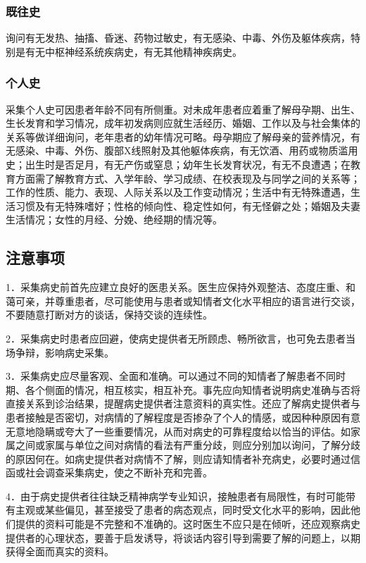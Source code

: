 \subsubsection{既往史}

询问有无发热、抽搐、昏迷、药物过敏史，有无感染、中毒、外伤及躯体疾病，特别是有无中枢神经系统疾病史，有无其他精神疾病史。

\subsubsection{个人史}

采集个人史可因患者年龄不同有所侧重。对未成年患者应着重了解母孕期、出生、生长发育和学习情况，成年初发病则应就生活经历、婚姻、工作以及与社会集体的关系等做详细询问，老年患者的幼年情况可略。母孕期应了解母亲的营养情况，有无感染、中毒、外伤、腹部X线照射及其他躯体疾病，有无饮酒、用药或物质滥用史；出生时是否足月，有无产伤或窒息；幼年生长发育状况，有无不良遭遇；在教育方面需了解教育方式、入学年龄、学习成绩、在校表现及与同学之间的关系等；工作的性质、能力、表现、人际关系以及工作变动情况；生活中有无特殊遭遇，生活习惯及有无特殊嗜好；性格的倾向性、稳定性如何，有无怪僻之处；婚姻及夫妻生活情况；女性的月经、分娩、绝经期的情况等。

\subsection{注意事项}

1．采集病史前首先应建立良好的医患关系。医生应保持外观整洁、态度庄重、和蔼可亲，并尊重患者，尽可能使用与患者或知情者文化水平相应的语言进行交谈，不要随意打断对方的谈话，保持交谈的连续性。

2．采集病史时患者应回避，使病史提供者无所顾虑、畅所欲言，也可免去患者当场争辩，影响病史采集。

3．采集病史应尽量客观、全面和准确。可以通过不同的知情者了解患者不同时期、各个侧面的情况，相互核实，相互补充。事先应向知情者说明病史准确与否将直接关系到诊治结果，提醒病史提供者注意资料的真实性。还应了解病史提供者与患者接触是否密切，对病情的了解程度是否掺杂了个人的情感，或因种种原因有意无意地隐瞒或夸大了一些重要情况，从而对病史的可靠程度给以恰当的评估。如家属之间或家属与单位之间对病情的看法有严重分歧，则应分别加以询问，了解分歧的原因何在。如病史提供者对病情不了解，则应请知情者补充病史，必要时通过信函或社会调查采集病史，使之不断补充和完善。

4．由于病史提供者往往缺乏精神病学专业知识，接触患者有局限性，有时可能带有主观或某些偏见，甚至接受了患者的病态观点，同时受文化水平的影响，因此他们提供的资料可能是不完整和不准确的。这时医生不应只是在倾听，还应观察病史提供者的心理状态，要善于启发诱导，将谈话内容引导到需要了解的问题上，以期获得全面而真实的资料。

